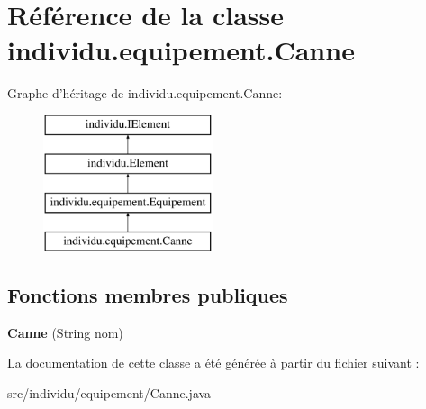 \hypertarget{classindividu_1_1equipement_1_1_canne}{\section{Référence de la classe individu.\-equipement.\-Canne}
\label{classindividu_1_1equipement_1_1_canne}
}
Graphe d'héritage de individu.\-equipement.\-Canne\-:\begin{figure}[H]
\begin{center}
\leavevmode
\includegraphics[height=4.000000cm]{classindividu_1_1equipement_1_1_canne}
\end{center}
\end{figure}
\subsection*{Fonctions membres publiques}
\begin{DoxyCompactItemize}
\item 
\hypertarget{classindividu_1_1equipement_1_1_canne_a0932a1ff5435367acb523544f221c78c}{{\bfseries Canne} (String nom)}\label{classindividu_1_1equipement_1_1_canne_a0932a1ff5435367acb523544f221c78c}

\end{DoxyCompactItemize}


La documentation de cette classe a été générée à partir du fichier suivant \-:\begin{DoxyCompactItemize}
\item 
src/individu/equipement/Canne.\-java\end{DoxyCompactItemize}
